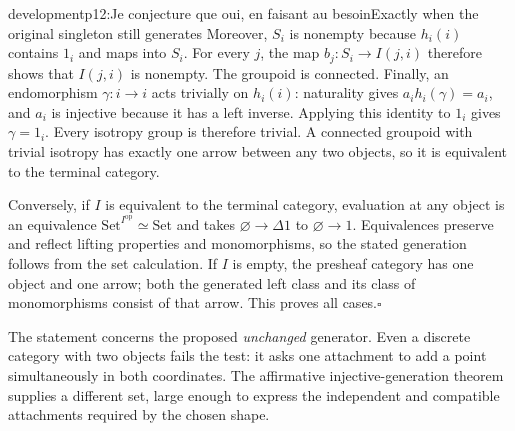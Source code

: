 \begin{dcomment}{development}{p12:Je conjecture que oui, en faisant au besoin}{Exactly when the original singleton still generates}
Moreover, $S_i$ is nonempty because $h_i(i)$ contains $1_i$ and maps into $S_i$. For every $j$, the map $b_j:S_i\to I(j,i)$ therefore shows that $I(j,i)$ is nonempty. The groupoid is connected. Finally, an endomorphism $\gamma:i\to i$ acts trivially on $h_i(i)$: naturality gives $a_ih_i(\gamma)=a_i$, and $a_i$ is injective because it has a left inverse. Applying this identity to $1_i$ gives $\gamma=1_i$. Every isotropy group is therefore trivial. A connected groupoid with trivial isotropy has exactly one arrow between any two objects, so it is equivalent to the terminal category.

Conversely, if $I$ is equivalent to the terminal category, evaluation at any object is an equivalence $\mathrm{Set}^{I^{\mathrm{op}}}\simeq\mathrm{Set}$ and takes $\varnothing\to\Delta1$ to $\varnothing\to1$. Equivalences preserve and reflect lifting properties and monomorphisms, so the stated generation follows from the set calculation. If $I$ is empty, the presheaf category has one object and one arrow; both the generated left class and its class of monomorphisms consist of that arrow. This proves all cases.\hfill$\square$

The statement concerns the proposed \emph{unchanged} generator. Even a discrete category with two objects fails the test: it asks one attachment to add a point simultaneously in both coordinates. The affirmative injective-generation theorem supplies a different set, large enough to express the independent and compatible attachments required by the chosen shape.
\end{dcomment}

